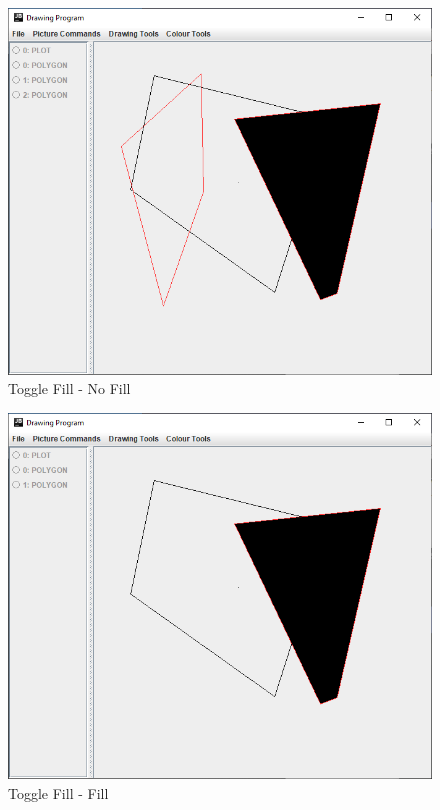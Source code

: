 \documentclass[12pt]{article} %
\begin{document}
\begin{figure}[H]
\caption{Toggle Fill - No Fill}
\centering
\includegraphics[scale=0.75]{pictures/toggleFirstWindow.PNG}
\end{figure}

\begin{figure}[H]
\caption{Toggle Fill - Fill}
\centering
\includegraphics[scale=0.75]{pictures/toggleSecondWindow.PNG}
\end{figure}
\end{document}
